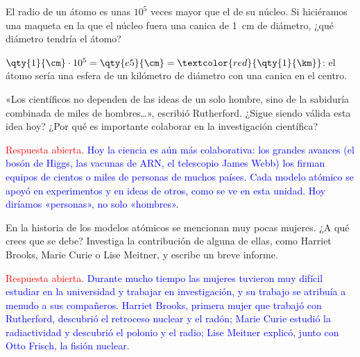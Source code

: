 \begin{exercise}
    El radio de un átomo es unas \(10^5\) veces mayor que el de su núcleo. Si hiciéramos una maqueta en la que el núcleo fuera
    una canica de \qty{1}{\cm} de diámetro, ¿qué diámetro tendría el átomo?
    \begin{solu}
        \(\qty{1}{\cm} \cdot 10^5 = \qty{e5}{\cm} = \textcolor{red}{\qty{1}{\km}}\): el átomo sería una esfera de un kilómetro de
        diámetro con una canica en el centro.
    \end{solu}
\end{exercise}

\begin{exercise}
    «Los científicos no dependen de las ideas de un solo hombre, sino de la sabiduría combinada de miles de hombres…», escribió
    Rutherford. ¿Sigue siendo válida esta idea hoy? ¿Por qué es importante colaborar en la investigación científica?
    \begin{solu}
        \textcolor{red}{Respuesta abierta.} \textcolor{blue}{Hoy la ciencia es aún más colaborativa: los grandes avances
        (el bosón de Higgs, las vacunas de ARN, el telescopio James Webb) los firman equipos de cientos o miles de personas de
        muchos países. Cada modelo atómico se apoyó en experimentos y en ideas de otros, como se ve en esta unidad. Hoy diríamos
        «personas», no solo «hombres».}
    \end{solu}
\end{exercise}

\begin{exercise}
    En la historia de los modelos atómicos se mencionan muy pocas mujeres. ¿A qué crees que se debe? Investiga la contribución de
    alguna de ellas, como Harriet Brooks, Marie Curie o Lise Meitner, y escribe un breve informe.
    \begin{solu}
        \textcolor{red}{Respuesta abierta.} \textcolor{blue}{Durante mucho tiempo las mujeres tuvieron muy difícil estudiar en la
        universidad y trabajar en investigación, y su trabajo se atribuía a menudo a sus compañeros. Harriet Brooks, primera mujer
        que trabajó con Rutherford, descubrió el retroceso nuclear y el radón; Marie Curie estudió la radiactividad y descubrió el
        polonio y el radio; Lise Meitner explicó, junto con Otto Frisch, la fisión nuclear.}
    \end{solu}
\end{exercise}

